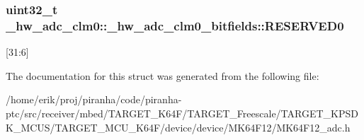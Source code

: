 \subsubsection[{\texorpdfstring{R\+E\+S\+E\+R\+V\+E\+D0}{RESERVED0}}]{\setlength{\rightskip}{0pt plus 5cm}uint32\+\_\+t \+\_\+hw\+\_\+adc\+\_\+clm0\+::\+\_\+hw\+\_\+adc\+\_\+clm0\+\_\+bitfields\+::\+R\+E\+S\+E\+R\+V\+E\+D0}\hypertarget{struct__hw__adc__clm0_1_1__hw__adc__clm0__bitfields_aba248e4a1854b23c0d9e2791cede0d71}{}\label{struct__hw__adc__clm0_1_1__hw__adc__clm0__bitfields_aba248e4a1854b23c0d9e2791cede0d71}
\mbox{[}31\+:6\mbox{]} 

The documentation for this struct was generated from the following file\+:\begin{DoxyCompactItemize}
\item 
/home/erik/proj/piranha/code/piranha-\/ptc/src/receiver/mbed/\+T\+A\+R\+G\+E\+T\+\_\+\+K64\+F/\+T\+A\+R\+G\+E\+T\+\_\+\+Freescale/\+T\+A\+R\+G\+E\+T\+\_\+\+K\+P\+S\+D\+K\+\_\+\+M\+C\+U\+S/\+T\+A\+R\+G\+E\+T\+\_\+\+M\+C\+U\+\_\+\+K64\+F/device/device/\+M\+K64\+F12/M\+K64\+F12\+\_\+adc.\+h\end{DoxyCompactItemize}

